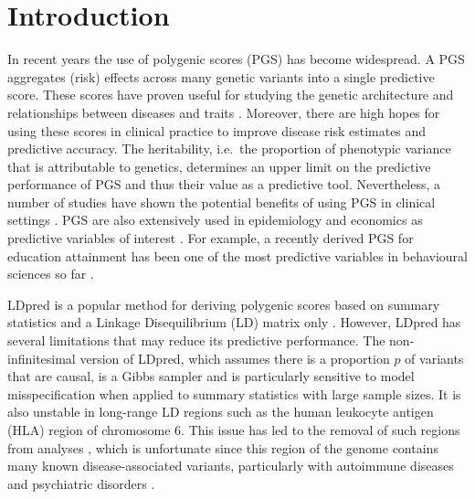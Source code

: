 \documentclass{bioinfo}
\begin{document}
\maketitle

\section{Introduction}

In recent years the use of polygenic scores (PGS) has become widespread. A PGS aggregates (risk) effects across many genetic variants into a single predictive score. These scores have proven useful for studying the genetic architecture and relationships between diseases and traits \cite[]{purcell2009common,kong2018nature}.
Moreover, there are high hopes for using these scores in clinical practice to improve disease risk estimates and predictive accuracy.
The heritability, i.e.\ the proportion of phenotypic variance that is attributable to genetics, determines an upper limit on the predictive performance of PGS and thus their value as a predictive tool.
Nevertheless, a number of studies have shown the potential benefits of using PGS in clinical settings \cite[]{pashayan2015implications,willoughby2019genetic,abraham2019genomic}.
PGS are also extensively used in epidemiology and economics as predictive variables of interest \cite[]{musliner2015polygenic,horsdal2019association,barth2020genetic,harden2020using}. 
For example, a recently derived PGS for education attainment has been one of the most predictive variables in behavioural sciences so far \cite[]{allegrini2019genomic}.

LDpred is a popular method for deriving polygenic scores based on summary statistics and a Linkage Disequilibrium (LD) matrix only \cite[]{vilhjalmsson2015modeling}.
However, LDpred has several limitations that may reduce its predictive performance.
The non-infinitesimal version of LDpred, which assumes there is a proportion $p$ of variants that are causal, is a Gibbs sampler and is particularly sensitive to model misspecification when applied to summary statistics with large sample sizes.
It is also unstable in long-range LD regions such as the human leukocyte antigen (HLA) region of chromosome 6. 
This issue has led to the removal of such regions from analyses  \cite[]{marquez2018modeling,lloyd2019improved}, which is unfortunate since this region of the genome contains many known disease-associated variants, particularly with autoimmune diseases and psychiatric disorders \cite[]{mokhtari2016major,matzaraki2017mhc}.
\end{document}
